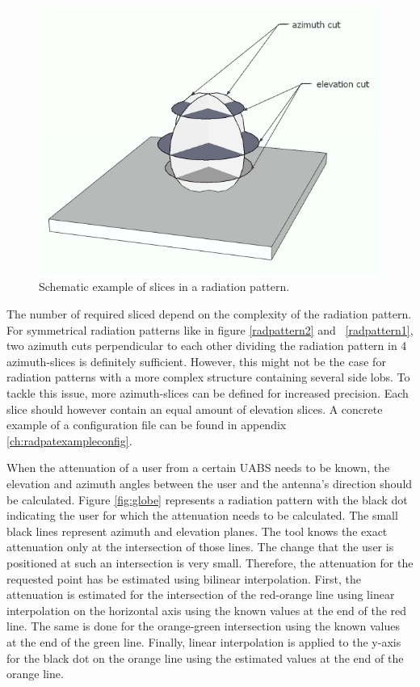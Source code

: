 \begin{figure}[H]
  \includegraphics[width=\textwidth]{../images/3Dimages/slicesOfPattern.jpg}
  \caption{Schematic example of slices in a radiation pattern.}
  \label{fig:slicesOfPattern}
\end{figure}

The number of required sliced depend on the complexity of the radiation pattern. For symmetrical radiation patterns like 
in figure \ref{radpattern2} and  \ref{radpattern1}, two azimuth cuts perpendicular to each other dividing the radiation pattern in 4 azimuth-slices 
is definitely sufficient. However, this might not be the case for radiation patterns with a more complex structure containing several  
side lobs. To tackle this issue, more azimuth-slices can be defined for increased precision. Each slice should however contain an equal amount 
of elevation slices.  A concrete example of a configuration file can be found in appendix \ref{ch:radpatexampleconfig}.

When the attenuation of a user from a certain \gls{UABS} needs to be known, the elevation and azimuth angles between the user and the antenna's direction 
should be calculated. 
Figure \ref{fig:globe} represents a radiation pattern with the black dot indicating the user for which the attenuation needs to be calculated.
 The small black lines represent azimuth and elevation planes. 
The tool knows the exact attenuation only at the intersection of those lines. 
The change that the user is positioned at such an intersection is very small. Therefore, the attenuation for the requested point has be estimated using bilinear interpolation.
First, the attenuation is estimated for the intersection of the red-orange line using linear interpolation on the horizontal axis using the known values
 at the end of the red line. The same is done for the orange-green intersection using the known values at the end of the green line. Finally, linear interpolation
is applied to the y-axis for the black dot on the orange line using the estimated values at the end of the orange line.

